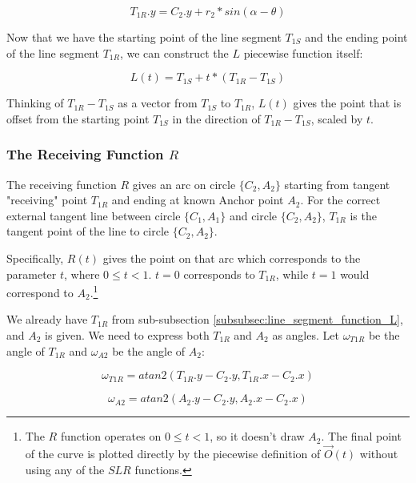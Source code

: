 \documentclass{article}
\begin{document}
\begin{equation}
    \label{eq:T_1R.y}
    T_{1R}.y = C_2.y + r_2 * sin(\alpha - \theta)
\end{equation}

Now that we have the starting point of the line segment $T_{1S}$ and the ending point of the line segment $T_{1R}$, we can construct the $L$ piecewise function itself:

\begin{equation}
    \label{eq:L(t)}
    L(t) = T_{1S} + t * ( T_{1R} - T_{1S} )
\end{equation}

Thinking of $T_{1R} - T_{1S}$ as a vector from $T_{1S}$ to $T_{1R}$, $L(t)$ gives the point that is offset from the starting point $T_{1S}$ in the direction of $T_{1R} - T_{1S}$, scaled by $t$.

\subsubsection{The Receiving Function $R$}
The receiving function $R$ gives an arc on circle $\{C_2, A_2\}$ starting from tangent "receiving" point $T_{1R}$ and ending at known Anchor point $A_2$. For the correct external tangent line between circle $\{C_1, A_1\}$ and circle $\{C_2, A_2\}$, $T_{1R}$ is the tangent point of the line to circle $\{C_2, A_2\}$.

Specifically, $R(t)$ gives the point on that arc which corresponds to the parameter $t$, where $0 \leq t < 1$. $t = 0$ corresponds to $T_{1R}$, while $t = 1$ would correspond to $A_{2}$.\footnote{The $R$ function operates on $0 \leq t < 1$, so it doesn't draw $A_2$. The final point of the curve is plotted directly by the piecewise definition of $\overrightarrow{O}(t)$ without using any of the $SLR$ functions. }

We already have $T_{1R}$ from sub-subsection \ref{subsubsec:line_segment_function_L}, and $A_2$ is given. We need to express both $T_{1R}$ and $A_2$ as angles. Let $\omega_{T1R}$ be the angle of $T_{1R}$ and $\omega_{A2}$ be the angle of $A_2$:

\begin{equation}
    \label{eq:omega_T1R}
    \omega_{T1R} = atan2(T_{1R}.y - C_2.y, T_{1R}.x - C_2.x)
\end{equation}

\begin{equation}
    \label{eq:omega_A2}
    \omega_{A2} = atan2(A_2.y - C_2.y, A_2.x - C_2.x)
\end{equation}
\end{document}
